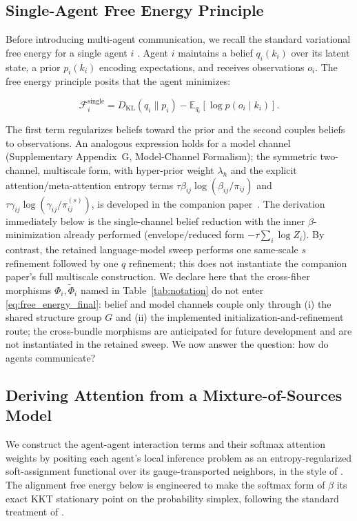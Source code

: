 \documentclass[twoside,11pt]{article}
\begin{document}
\subsection{Single-Agent Free Energy Principle}

Before introducing multi-agent communication, we recall the standard variational free energy for a single agent $i$ \citep{Friston2010,parr2022active}. Agent $i$ maintains a belief $q_i(k_i)$ over its latent state, a prior $p_i(k_i)$ encoding expectations, and receives observations $o_i$. The free energy principle posits that the agent minimizes:

\begin{equation}
\mathcal{F}_i^{\text{single}} = D_{\mathrm{KL}}(q_i \| p_i) - \mathbb{E}_{q_i}[\log p(o_i \mid k_i)].
\label{eq:single_agent_fep}
\end{equation}

The first term regularizes beliefs toward the prior and the second couples beliefs to observations. An analogous expression holds for a model channel (Supplementary Appendix~G, Model-Channel Formalism); the symmetric two-channel, multiscale form, with hyper-prior weight $\lambda_h$ and the explicit attention/meta-attention entropy terms $\tau\beta_{ij}\log(\beta_{ij}/\pi_{ij})$ and $\tau\gamma_{ij}\log(\gamma_{ij}/\pi^{(s)}_{ij})$, is developed in the companion paper~\citep{Dennis2025it}. The derivation immediately below is the single-channel belief reduction with the inner $\beta$-minimization already performed (envelope/reduced form $-\tau\sum_i \log Z_i$). By contrast, the retained language-model sweep performs one same-scale $s$ refinement followed by one $q$ refinement; this does not instantiate the companion paper's full multiscale construction. We declare here that the cross-fiber morphisms $\Phi_i, \tilde{\Phi}_i$ named in Table~\ref{tab:notation} do not enter \eqref{eq:free_energy_final}: belief and model channels couple only through (i) the shared structure group $G$ and (ii) the implemented initialization-and-refinement route; the cross-bundle morphisms are anticipated for future development and are not instantiated in the retained sweep. We now answer the question: how do agents communicate?

\subsection{Deriving Attention from a Mixture-of-Sources Model}
\label{sec:mixture_derivation}

We construct the agent-agent interaction terms and their softmax attention weights by positing each agent's local inference problem as an entropy-regularized soft-assignment functional over its gauge-transported neighbors, in the style of \citet{Cuturi2013}. The alignment free energy below is engineered to make the softmax form of $\beta$ its exact KKT stationary point on the probability simplex, following the standard treatment of \citet{Boyd2004}.
\end{document}
